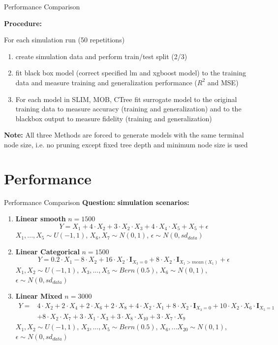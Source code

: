 \documentclass[9pt, xcolor=table]{beamer}
\begin{document}
\begin{frame}{Performance Comparison}


\textbf{Procedure:} 

For each simulation run (50 repetitions)
\begin{enumerate}
    \item create simulation data and perform train/test split (2/3)
    \item fit black box model (correct specified lm and xgboost model) to the training data and measure training and generalization performance ($R^2$ and MSE)
    \item For each model in SLIM, MOB, CTree fit surrogate model to the original training data to measure accuracy (training and generalization) and to the blackbox output to measure fidelity (training and generalization)
\end{enumerate}

\textbf{Note:} All three Methods are forced to generate models with the same terminal node size, i.e. no pruning except fixed tree depth and minimum node size is used

\end{frame}

\section{Performance}
\begin{frame}{Performance Comparison}
\textbf{Question:} 
\textbf{simulation scenarios:}
\begin{enumerate}
    \item \textbf{Linear smooth} $n= 1500$ $$ Y = X_1 + 4 \cdot X_2 + 3 \cdot X_2 \cdot X_3 + 4\cdot X_4\cdot X_5 + X_5 + \epsilon $$
    $X_1,..., X_5 \sim U(-1,1)$, $X_6, X_7 \sim N(0,1)$, $\epsilon \sim N(0, sd_{data})$
    
    \item \textbf{Linear Categorical} $n= 1500$ $$ Y =  0.2\cdot X_{1} - 8\cdot X_2 + 16\cdot X_2\cdot \mathbf{I}_{X_3 = 0} + 8\cdot X_2\cdot \mathbf{I}_{X_1 > mean(X_1)} + \epsilon $$
    $X_1, X_2 \sim U(-1,1)$, $X_3, ..., X_5 \sim Bern(0.5)$, $X_6 \sim N(0,1)$,  $\epsilon \sim N(0, sd_{data})$
    
    \item \textbf{Linear Mixed}  $n= 3000$
    \begin{align*}
    Y = & 4 \cdot X_2 + 2 \cdot X_4 + 2 \cdot X_6 + 2 \cdot X_8 + 4 \cdot X_2 \cdot X_1 + 8 \cdot X_2 \cdot \mathbf{I}_{X_3 = 0} + 10 \cdot X_2 \cdot X_6  \cdot \mathbf{I}_{X_5 = 1} \\
    & + 8 \cdot X_2 \cdot X_7 + 3 \cdot X_1 \cdot X_3 + 3 \cdot X_8 \cdot X_10 + 3 \cdot X_7 \cdot X_9     
    \end{align*}
    $X_1, X_2 \sim U(-1,1)$, $X_3, ..., X_5 \sim Bern(0.5)$, $X_6, ... X_20 \sim N(0,1)$,  $\epsilon \sim N(0, sd_{data})$
\end{enumerate}
    
\end{frame}
\end{document}
